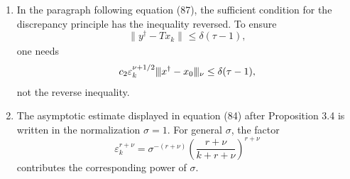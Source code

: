 \documentclass[10pt,a4paper]{article}
\newcommand{\norm}[2]{     \| #1       \|_{ #2 }}
\newcommand{\normiii}[2]{\vert\kern-0.25ex\vert\kern-0.25ex\vert #1 \vert\kern-0.25ex \vert\kern-0.25ex\vert_{ #2 }}
\begin{document}
\begin{enumerate}
\item[\textup{(E15)}]
In the paragraph following equation (87), the sufficient condition for the discrepancy principle has the inequality reversed.  To ensure
\[
    \norm{y^\dag-Tx_k}{}\le\delta(\tau-1),
\]
one needs
\[
    c_2\varepsilon_k^{\nu+1/2}
    \normiii{x^\dag-x_0}{\nu}
    \le
    \delta(\tau-1),
\]
not the reverse inequality.

\item[\textup{(E16)}]
The asymptotic estimate displayed in equation (84) after Proposition 3.4 is written in the normalization $\sigma=1$.  For general $\sigma$, the factor
\[
    \varepsilon_k^{r+\nu}
    =
    \sigma^{-(r+\nu)}
    \left(\frac{r+\nu}{k+r+\nu}\right)^{r+\nu}
\]
contributes the corresponding power of $\sigma$.

\end{enumerate}

































\end{document}
